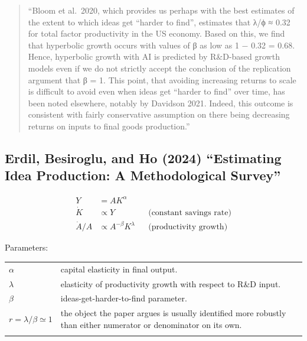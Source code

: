 \documentclass[
  11pt,
  letterpaper,
  DIV=11,
  numbers=noendperiod]{scrartcl}
\begin{document}
\begin{quote}
``Bloom et al.~2020, which provides us perhaps with the best estimates
of the extent to which ideas get ``harder to find'', estimates that λ/ϕ
≈ 0.32 for total factor productivity in the US economy. Based on this,
we find that hyperbolic growth occurs with values of β as low as 1 −
0.32 = 0.68. Hence, hyperbolic growth with AI is predicted by R\&D-based
growth models even if we do not strictly accept the conclusion of the
replication argument that β = 1. This point, that avoiding increasing
returns to scale is difficult to avoid even when ideas get ``harder to
find'' over time, has been noted elsewhere, notably by Davidson 2021.
Indeed, this outcome is consistent with fairly conservative assumption
on there being decreasing returns on inputs to final goods production.''
\end{quote}

\subsection{Erdil, Besiroglu, and Ho (2024) ``Estimating Idea
Production: A Methodological
Survey''}\label{erdil2024estimating-estimating-idea-production-a-methodological-survey}

\[\begin{aligned}
    Y &= AK^\alpha \\
    \dot{K} &\propto Y && \text{(constant savings rate)}\\
    \dot{A}/A &\propto A^{-\beta}K^\lambda && \text{(productivity growth)}
\end{aligned}
\]

Parameters:

\begin{longtable}[]{@{}
  >{\raggedright\arraybackslash}p{}
  >{\raggedright\arraybackslash}p{}@{}}
\toprule\noalign{}
\endhead
\bottomrule\noalign{}
\endlastfoot
\(\alpha\) & capital elasticity in final output. \\
\(\lambda\) & elasticity of productivity growth with respect to R\&D
input. \\
\(\beta\) & ideas-get-harder-to-find parameter. \\
\(r=\lambda/\beta\simeq 1\) & the object the paper argues is usually
identified more robustly than either numerator or denominator on its
own. \\
& \\
\end{longtable}
\end{document}
